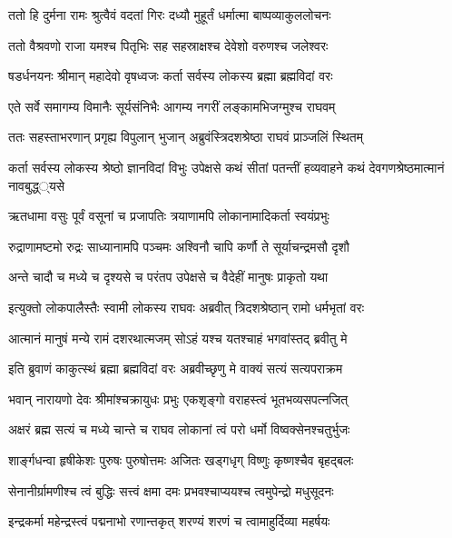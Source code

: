
\twolineshloka
{ततो हि दुर्मना रामः श्रुत्वैवं वदतां गिरः}
{दध्यौ मुहूर्तं धर्मात्मा बाष्पव्याकुललोचनः} %

\twolineshloka
{ततो वैश्रवणो राजा यमश्च पितृभिः सह}
{सहस्राक्षश्च देवेशो वरुणश्च जलेश्वरः} %

\twolineshloka
{षडर्धनयनः श्रीमान् महादेवो वृषध्वजः}
{कर्ता सर्वस्य लोकस्य ब्रह्मा ब्रह्मविदां वरः} %

\twolineshloka
{एते सर्वे समागम्य विमानैः सूर्यसंनिभैः}
{आगम्य नगरीं लङ्कामभिजग्मुश्च राघवम्} %

\twolineshloka
{ततः सहस्ताभरणान् प्रगृह्य विपुलान् भुजान्}
{अब्रुवंस्त्रिदशश्रेष्ठा राघवं प्राञ्जलिं स्थितम्} %

\threelineshloka
{कर्ता सर्वस्य लोकस्य श्रेष्ठो ज्ञानविदां विभुः}
{उपेक्षसे कथं सीतां पतन्तीं हव्यवाहने}
{कथं देवगणश्रेष्ठमात्मानं नावबुद्ध््यसे} %

\twolineshloka
{ऋतधामा वसुः पूर्वं वसूनां च प्रजापतिः}
{त्रयाणामपि लोकानामादिकर्ता स्वयंप्रभुः} %

\twolineshloka
{रुद्राणामष्टमो रुद्रः साध्यानामपि पञ्चमः}
{अश्विनौ चापि कर्णौ ते सूर्याचन्द्रमसौ दृशौ} %

\twolineshloka
{अन्ते चादौ च मध्ये च दृश्यसे च परंतप}
{उपेक्षसे च वैदेहीं मानुषः प्राकृतो यथा} %

\twolineshloka
{इत्युक्तो लोकपालैस्तैः स्वामी लोकस्य राघवः}
{अब्रवीत् त्रिदशश्रेष्ठान् रामो धर्मभृतां वरः} %

\twolineshloka
{आत्मानं मानुषं मन्ये रामं दशरथात्मजम्}
{सोऽहं यश्च यतश्चाहं भगवांस्तद् ब्रवीतु मे} %

\twolineshloka
{इति ब्रुवाणं काकुत्स्थं ब्रह्मा ब्रह्मविदां वरः}
{अब्रवीच्छृणु मे वाक्यं सत्यं सत्यपराक्रम} %

\twolineshloka
{भवान् नारायणो देवः श्रीमांश्चक्रायुधः प्रभुः}
{एकशृङ्गो वराहस्त्वं भूतभव्यसपत्नजित्} %

\twolineshloka
{अक्षरं ब्रह्म सत्यं च मध्ये चान्ते च राघव}
{लोकानां त्वं परो धर्मो विष्वक्सेनश्चतुर्भुजः} %

\twolineshloka
{शार्ङ्गधन्वा हृषीकेशः पुरुषः पुरुषोत्तमः}
{अजितः खड्गधृग् विष्णुः कृष्णश्चैव बृहद्बलः} %

\twolineshloka
{सेनानीर्ग्रामणीश्च त्वं बुद्धिः सत्त्वं क्षमा दमः}
{प्रभवश्चाप्ययश्च त्वमुपेन्द्रो मधुसूदनः} %

\twolineshloka
{इन्द्रकर्मा महेन्द्रस्त्वं पद्मनाभो रणान्तकृत्}
{शरण्यं शरणं च त्वामाहुर्दिव्या महर्षयः} %

